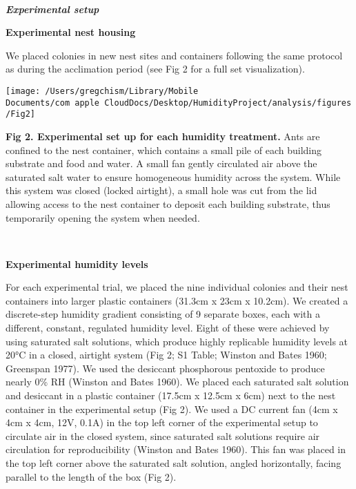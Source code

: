 \documentclass[3p]{elsarticle} %
\begin{document}
~

\textbf{\emph{Experimental setup}}

\textbf{Experimental nest housing}

We placed colonies in new nest sites and containers following the same
protocol as during the acclimation period (see Fig 2 for a full set
visualization).

\begin{flushleft}\texttt{[image: /Users/gregchism/Library/Mobile Documents/com~apple~CloudDocs/Desktop/HumidityProject/analysis/figures/Fig2]} \end{flushleft}

\textbf{Fig 2. Experimental set up for each humidity treatment.} Ants
are confined to the nest container, which contains a small pile of each
building substrate and food and water. A small fan gently circulated air
above the saturated salt water to ensure homogeneous humidity across the
system. While this system was closed (locked airtight), a small hole was
cut from the lid allowing access to the nest container to deposit each
building substrate, thus temporarily opening the system when needed.

~

\textbf{Experimental humidity levels}

For each experimental trial, we placed the nine individual colonies and
their nest containers into larger plastic containers (31.3cm x 23cm x
10.2cm). We created a discrete-step humidity gradient consisting of 9
separate boxes, each with a different, constant, regulated humidity
level. Eight of these were achieved by using saturated salt solutions,
which produce highly replicable humidity levels at 20°C in a closed,
airtight system (Fig 2; S1 Table; Winston and Bates 1960; Greenspan
1977). We used the desiccant phosphorous pentoxide to produce nearly 0\%
RH (Winston and Bates 1960). We placed each saturated salt solution and
desiccant in a plastic container (17.5cm x 12.5cm x 6cm) next to the
nest container in the experimental setup (Fig 2). We used a DC current
fan (4cm x 4cm x 4cm, 12V, 0.1A) in the top left corner of the
experimental setup to circulate air in the closed system, since
saturated salt solutions require air circulation for reproducibility
(Winston and Bates 1960). This fan was placed in the top left corner
above the saturated salt solution, angled horizontally, facing parallel
to the length of the box (Fig 2).

~
\end{document}
